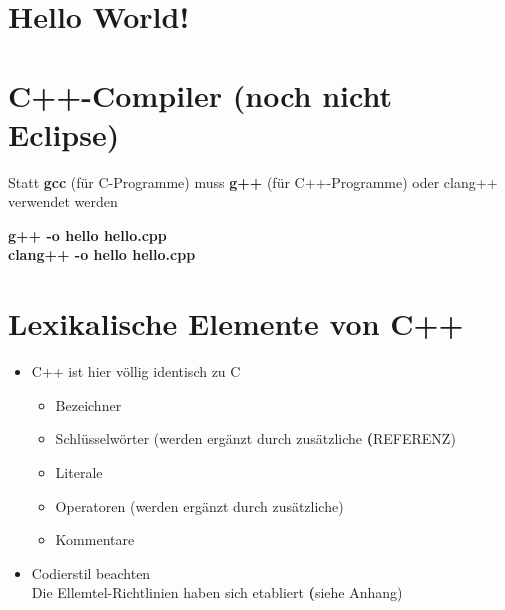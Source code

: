 \section{Hello World!}
\label{sec:Hello World!}
\noindent
\begin{minipage}{\linewidth}

\label{lst:Hello World!}
\end{minipage}

\section{C++-Compiler (noch nicht Eclipse)}
\label{sec:C++-Compiler (noch nicht Eclipse)}
Statt \textbf{gcc} (für C-Programme) muss \textbf{g++} (für C++-Programme) oder clang++ verwendet werden
\\
\begin{center}
\textbf{g++ -o hello hello.cpp}
\\
\textbf{clang++ -o hello hello.cpp}
\end{center}

\section{Lexikalische Elemente von C++}
\label{sec:Lexikalische Elemente von C++}
\begin{itemize}
	\item C++ ist hier völlig identisch zu C
	\begin{itemize}
		\item Bezeichner
		\item Schlüsselwörter (werden ergänzt durch zusätzliche \textbf(\color{red}REFERENZ\color{black})
		\item Literale
		\item Operatoren (werden ergänzt durch zusätzliche)
		\item Kommentare
	\end{itemize}
	\item Codierstil beachten
		\\ Die Ellemtel-Richtlinien haben sich etabliert \textbf(\color{red}siehe Anhang)
\end{itemize}

